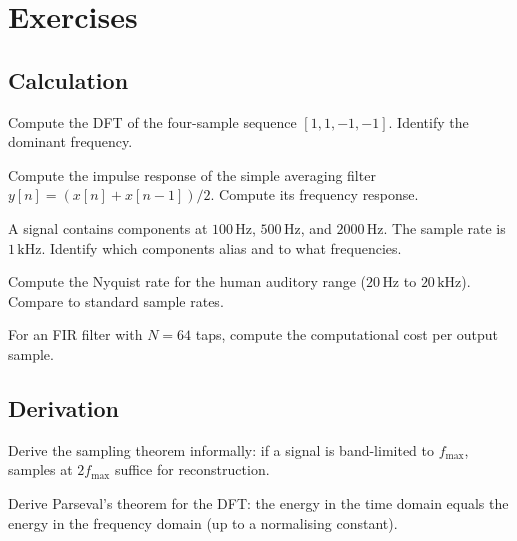 \section{Exercises}

\subsection*{Calculation}

\begin{exercise}
Compute the DFT of the four-sample sequence $[1, 1, -1, -1]$. Identify the dominant frequency.
\end{exercise}

\begin{exercise}
Compute the impulse response of the simple averaging filter $y[n] = (x[n] + x[n-1])/2$. Compute its frequency response.
\end{exercise}

\begin{exercise}
A signal contains components at $100\,\si{\hertz}$, $500\,\si{\hertz}$, and $2000\,\si{\hertz}$. The sample rate is $1\,\si{\kilo\hertz}$. Identify which components alias and to what frequencies.
\end{exercise}

\begin{exercise}
Compute the Nyquist rate for the human auditory range ($20\,\si{\hertz}$ to $20\,\si{\kilo\hertz}$). Compare to standard sample rates.
\end{exercise}

\begin{exercise}
For an FIR filter with $N = 64$ taps, compute the computational cost per output sample.
\end{exercise}

\subsection*{Derivation}

\begin{exercise}
Derive the sampling theorem informally: if a signal is band-limited to $f_{\max}$, samples at $2 f_{\max}$ suffice for reconstruction.
\end{exercise}

\begin{exercise}
Derive Parseval's theorem for the DFT: the energy in the time domain equals the energy in the frequency domain (up to a normalising constant).
\end{exercise}

